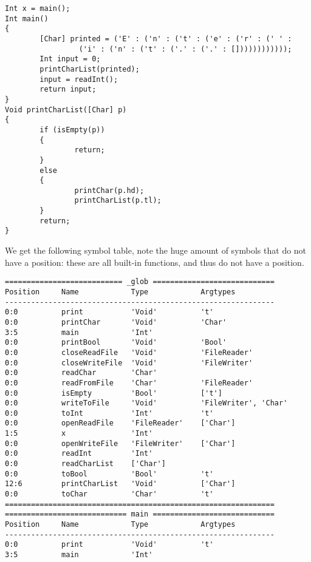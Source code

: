 \documentclass[a4paper]{article}
\begin{document}
\begin{verbatim}
Int x = main();
Int main()
{
        [Char] printed = ('E' : ('n' : ('t' : ('e' : ('r' : (' ' : 
                 ('i' : ('n' : ('t' : ('.' : ('.' : [])))))))))));
        Int input = 0;
        printCharList(printed);
        input = readInt();
        return input;
}
Void printCharList([Char] p)
{
        if (isEmpty(p))
        {
                return;
        }
        else
        {
                printChar(p.hd);
                printCharList(p.tl);
        }
        return;
}
\end{verbatim}
We get the following symbol table, note the huge amount of symbols that do not have a position: these are all built-in functions, and thus do not have a position.
\begin{verbatim}
=========================== _glob ============================
Position     Name            Type            Argtypes            
--------------------------------------------------------------
0:0          print           'Void'          't'                 
0:0          printChar       'Void'          'Char'              
3:5          main            'Int'                               
0:0          printBool       'Void'          'Bool'              
0:0          closeReadFile   'Void'          'FileReader'        
0:0          closeWriteFile  'Void'          'FileWriter'        
0:0          readChar        'Char'                              
0:0          readFromFile    'Char'          'FileReader'        
0:0          isEmpty         'Bool'          ['t']               
0:0          writeToFile     'Void'          'FileWriter', 'Char'
0:0          toInt           'Int'           't'                 
0:0          openReadFile    'FileReader'    ['Char']            
1:5          x               'Int'                               
0:0          openWriteFile   'FileWriter'    ['Char']            
0:0          readInt         'Int'                               
0:0          readCharList    ['Char']                            
0:0          toBool          'Bool'          't'                 
12:6         printCharList   'Void'          ['Char']            
0:0          toChar          'Char'          't'                 
==============================================================
============================ main ============================
Position     Name            Type            Argtypes            
--------------------------------------------------------------
0:0          print           'Void'          't'                 
3:5          main            'Int'                               

\end{verbatim}
\end{document}
